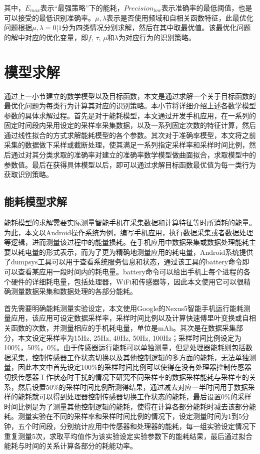 其中，$E_{max}$表示“最强策略”下的能耗，$Precision_{low}$表示准确率的最低阈值，也是可以接受的最低识别准确率。$\mu, \lambda$表示是否使用频域和自相关函数特征，此最优化问题根据$\mu, \lambda = 0|1$分为四类情况分别求解，然后在其中取最优值。该最优化问题的解中对应的优化变量，即$f$, $\tau$, $\mu$和$\lambda$为对应行为的识别策略。


\section{模型求解}
\par 通过上一小节建立的数学模型以及目标函数，本文是通过求解一个关于目标函数的最优化问题为每类行为计算其对应的识别策略。本小节将详细介绍上述各数学模型参数的具体求解过程。首先是对于能耗模型，本文通过开发手机应用，在一系列的固定时间段内采用设定的采样率采集数据，以及一系列固定次数的特征计算，然后通过线性拟合的方式求解能耗模型的各个参数。其次对于准确率模型，本文将之前采集的数据做下采样或截断处理，使其满足一系列指定采样率和采样时间比例，然后通过对其分类求取的准确率对建立的准确率数学模型做曲面拟合，求取模型中的参数值。最后在获得具体模型以后，即可以通过求解目标函数最优值为每一类行为获取识别策略。

\subsection{能耗模型求解}
\par 能耗模型的求解需要实际测量智能手机在采集数据和计算特征等时所消耗的能量。为此，本文以Android操作系统为例，编写手机应用，执行数据采集或者数据处理等逻辑，进而测量该过程中的能量损耗。在手机应用中数据采集或数据处理能耗主要以耗电量的形式表示，而为了更为精确地测量应用的耗电量，Android系统提供了dumpsys工具可以用于查看系统服务信息和状态，通过该工具的battery命令即可以查看某应用一段时间内的耗电量。battery命令可以给出手机上每个进程的各个硬件的详细耗电量，包括处理器，WiFi和传感器等，因此本文使用它可以很精确测量数据采集和数据处理的各部分能耗。
\par 首先需要明确能耗测量实验设定，本文使用Google的Nexus5智能手机运行能耗测量应用，该应用可设定数据采样率，采样时间比例以及计算快速傅里叶变换或自相关函数的次数，并测量相应的手机耗电量，单位是mAh。其次是在数据采集部分，本文设定采样率为15Hz, 25Hz, 40Hz, 50Hz, 100Hz；采样时间比例设定为100\%，50\%，0\%。由于传感器运行能耗可以单独测量，但是处理器能耗则包括数据采集，控制传感器工作状态切换以及其他控制逻辑的多方面的能耗，无法单独测量，因此本文中首先设定100\%的采样时间比例可以使得在没有处理器控制传感器切换传感器工作状态时干扰的情况下研究不同采样率的数据采样能耗与采样率的关系，然后设置50\%的采样时间比例所测得结果，通过减去对应一半时间用于数据采样的能耗就可以得到处理器控制传感器切换工作状态的能耗，最后设置0\%的采样时间比例是为了测量其他控制逻辑的能耗，使得在计算各部分能耗时减去该部分能耗。测量实验在不同的采样率和采样时间比例的情况下，设定测量时间为1到5分钟，五个时间段，分别统计应用中传感器和处理器的能耗，每一组实验设定情况下重复测量5次，求取平均值作为该实验设定实验参数下的能耗结果，最后通过拟合能耗与时间的关系计算各部分的耗能功率。

